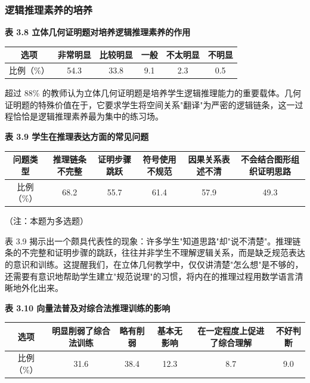 \documentclass[UTF8,a4paper,12pt,twoside]{ctexart}
\begin{document}
\subsubsection{逻辑推理素养的培养}

\textbf{表 3.8 立体几何证明题对培养逻辑推理素养的作用}

\begin{center}
\begin{tabular}{|c|c|c|c|c|c|}
\hline
选项 & 非常明显 & 比较明显 & 一般 & 不太明显 & 不明显 \\
\hline
比例（\%） & 54.3 & 33.8 & 9.1 & 2.3 & 0.5 \\
\hline
\end{tabular}
\end{center}

超过 88\% 的教师认为立体几何证明题是培养学生逻辑推理能力的重要载体。几何证明题的特殊价值在于，它要求学生将空间关系"翻译"为严密的逻辑链条，这一过程恰恰是逻辑推理素养最为集中的练习场。

\textbf{表 3.9 学生在推理表达方面的常见问题}

\begin{center}
\begin{tabular}{|c|c|c|c|c|c|}
\hline
问题类型 & 推理链条不完整 & 证明步骤跳跃 & 符号使用不规范 & 因果关系表述不清 & 不会结合图形组织证明思路 \\
\hline
比例（\%） & 68.2 & 55.7 & 61.4 & 57.9 & 49.3 \\
\hline
\end{tabular}
\end{center}

（注：本题为多选题）

表 3.9 揭示出一个颇具代表性的现象：许多学生"知道思路"却"说不清楚"。推理链条的不完整和证明步骤的跳跃，往往并非学生不理解逻辑关系，而是缺乏规范表达的意识和训练。这提醒我们，在立体几何教学中，仅仅讲清楚"怎么想"是不够的，还需要有意识地帮助学生建立"规范说理"的习惯，将内在的推理过程用数学语言清晰地外化出来。

\textbf{表 3.10 向量法普及对综合法推理训练的影响}

\begin{center}
\begin{tabular}{|c|c|c|c|c|c|}
\hline
选项 & 明显削弱了综合法训练 & 略有削弱 & 基本无影响 & 在一定程度上促进了综合理解 & 不好判断 \\
\hline
比例（\%） & 31.6 & 38.4 & 12.3 & 8.7 & 9.0 \\
\hline
\end{tabular}
\end{center}
\end{document}
